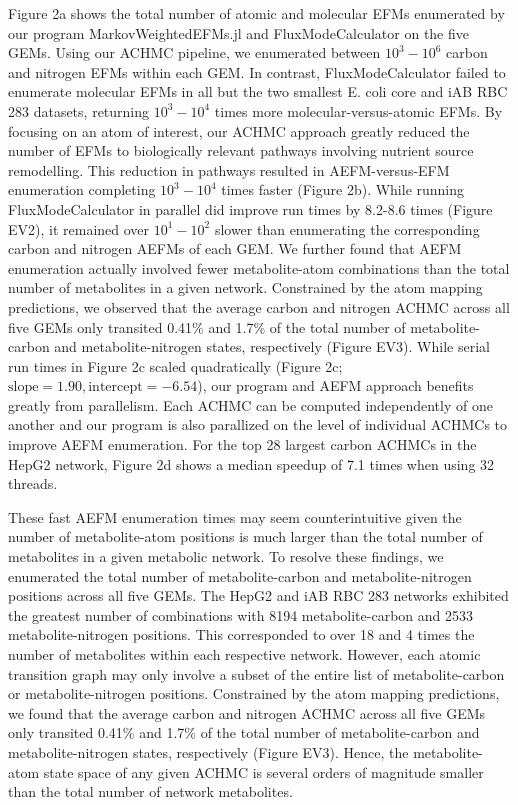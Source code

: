 \documentclass[12pt]{article}
\begin{document}
Figure 2a shows the total number of atomic and molecular EFMs enumerated
by our program MarkovWeightedEFMs.jl and FluxModeCalculator on the five
GEMs. Using our ACHMC pipeline, we enumerated between $10^3 - 10^6$ carbon
and nitrogen EFMs within each GEM. In contrast, FluxModeCalculator failed
to enumerate molecular EFMs in all but the two smallest E. coli core and
iAB RBC 283 datasets, returning $10^3 - 10^4$ times more
molecular-versus-atomic EFMs. By focusing on an atom of interest, our
ACHMC approach greatly reduced the number of EFMs to biologically relevant
pathways involving nutrient source remodelling. This reduction in pathways
resulted in AEFM-versus-EFM enumeration completing $10^3-10^4$ times
faster (Figure 2b). While running FluxModeCalculator in parallel did
improve run times by 8.2-8.6 times (Figure EV2), it remained over
$10^1-10^2$ slower than enumerating the corresponding carbon and nitrogen
AEFMs of each GEM. We further found that AEFM enumeration actually
involved fewer metabolite-atom combinations than the total number of
metabolites in a given network. Constrained by the atom mapping
predictions, we observed that the average carbon and nitrogen ACHMC across
all five GEMs only transited 0.41\% and 1.7\% of the total number of
metabolite-carbon and metabolite-nitrogen states, respectively (Figure
EV3). While serial run times in Figure 2c scaled quadratically (Figure 2c;
$\text{slope}=1.90, \text{intercept}=-6.54$), our program and AEFM
approach benefits greatly from parallelism. Each ACHMC can be computed
independently of one another and our program is also parallized on the
level of individual ACHMCs to improve AEFM enumeration. For the top 28
largest carbon ACHMCs in the HepG2 network, Figure 2d shows a median
speedup of 7.1 times when using 32 threads. 


\iffalse

These fast AEFM enumeration times may seem counterintuitive given the
number of metabolite-atom positions is much larger than the total number
of metabolites in a given metabolic network. To resolve these findings, we
enumerated the total number of metabolite-carbon and metabolite-nitrogen
positions across all five GEMs. The HepG2 and iAB RBC 283 networks
exhibited the greatest number of combinations with 8194 metabolite-carbon
and 2533 metabolite-nitrogen positions. This corresponded to over 18 and
4 times the number of metabolites within each respective network. However,
  each atomic transition graph may only involve a subset of the entire
  list of metabolite-carbon or metabolite-nitrogen positions. Constrained
  by the atom mapping predictions, we found that the average carbon and
  nitrogen ACHMC across all five GEMs only transited 0.41\% and
1.7\% of the total number of metabolite-carbon and metabolite-nitrogen
states, respectively (Figure EV3). Hence, the metabolite-atom state space
of any given ACHMC is several orders of magnitude smaller than the total
number of network metabolites.
\end{document}
